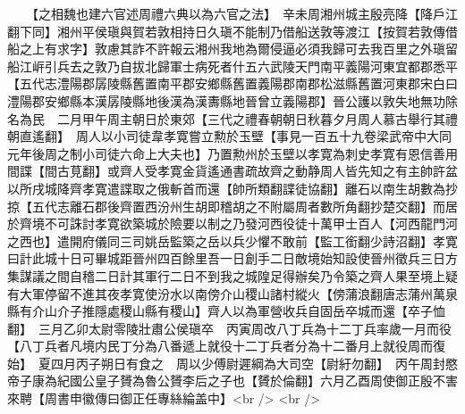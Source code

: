 　　【之相魏也建六官述周禮六典以為六官之法】　辛未周湘州城主殷亮降【降戶江翻下同】湘州平侯瑱與賀若敦相持日久瑱不能制乃借船送敦等渡江【按賀若敦傳借船之上有求字】敦慮其詐不許報云湘州我地為爾侵逼必須我歸可去我百里之外瑱留船江㟁引兵去之敦乃自拔北歸軍士病死者什五六武陵天門南平義陽河東宜都郡悉平【五代志澧陽郡孱陵縣舊置南平郡安鄉縣舊置義陽郡南郡松滋縣舊置河東郡宋白曰澧陽郡安鄉縣本漢孱陵縣地後漢為漢夀縣地晉曾立義陽郡】晉公護以敦失地無功除名為民　二月甲午周主朝日於東郊【三代之禮春朝朝日秋暮夕月周人慕古舉行其禮朝直遙翻】　周人以小司徒韋孝寛嘗立勲於玉壁【事見一百五十九卷梁武帝中大同元年後周之制小司徒六命上大夫也】乃置勲州於玉壁以孝寛為刺史孝寛有恩信善用間諜【間古莧翻】或齊人受孝寛金貨遙通書疏故齊之動静周人皆先知之有主帥許盆以所戌城降齊孝寛遣諜取之俄斬首而還【帥所類翻諜徒協翻】離石以南生胡數為抄掠【五代志離石郡後齊置西汾州生胡即稽胡之不附屬周者數所角翻抄楚交翻】而居於齊境不可誅討孝寛欲築城於險要以制之乃發河西役徒十萬甲士百人【河西龍門河之西也】遣開府儀同三司姚岳監築之岳以兵少懼不敢前【監工銜翻少詩沼翻】孝寛曰計此城十日可畢城距晉州四百餘里吾一日創手二日敵境始知設使晉州徵兵三日方集謀議之間自稽二日計其軍行二日不到我之城隍足得辦矣乃令築之齊人果至境上疑有大軍停留不進其夜孝寛使汾水以南傍介山稷山諸村縱火【傍蒲浪翻唐志蒲州萬泉縣有介山介子推隱處稷山縣有稷山】齊人以為軍營收兵自固岳卒城而還【卒子恤翻】　三月乙卯太尉零陵壯肅公侯瑱卒　丙寅周改八丁兵為十二丁兵率歲一月而役【八丁兵者凡境内民丁分為八番遞上就役十二丁兵者分為十二番月上就役周而復始】　夏四月丙子朔日有食之　周以少傅尉遲綱為大司空【尉紆勿翻】　丙午周封愍帝子康為紀國公皇子贇為魯公贇李后之子也【贇於倫翻】六月乙酉周使御正殷不害來聘【周書申徽傳曰御正任專絲綸盖中】<br />
<br />
